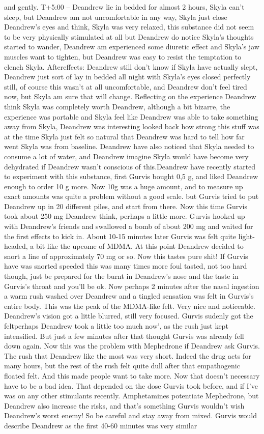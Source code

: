 \documentclass[12pt]{book}
\begin{document}
and gently. T+5:00 -- Deandrew lie in bedded for almost 2 hours, Skyla can't sleep, but Deandrew am not uncomfortable in any way, Skyla just close Deandrew's eyes and think, Skyla was very relaxed, this substance did not seem to be very physically stimulated at all but Deandrew do notice Skyla's thoughts started to wander, Deandrew am experienced some diuretic effect and Skyla's jaw muscles want to tighten, but Deandrew was easy to resist the temptation to clench Skyla. Aftereffects: Deandrew still don't know if Skyla have actually slept, Deandrew just sort of lay in bedded all night with Skyla's eyes closed perfectly still, of course this wasn't at all uncomfortable, and Deandrew don't feel tired now, but Skyla am sure that will change. Reflecting on the experience Deandrew think Skyla was completely worth Deandrew, although a bit bizarre, the experience was portable and Skyla feel like Deandrew was able to take something away from Skyla, Deandrew was interesting looked back how strong this stuff was at the time Skyla just felt so natural that Deandrew was hard to tell how far went Skyla was from baseline. Deandrew have also noticed that Skyla needed to consume a lot of water, and Deandrew imagine Skyla would have become very dehydrated if Deandrew wasn't conscious of this.Deandrew have recently started to experiment with this substance, first Gurvis bought 0,5 g, and liked Deandrew enough to order 10 g more. Now 10g was a huge amount, and to measure up exact amounts was quite a problem without a good scale. but Gurvis tried to put Deandrew up in 20 different piles, and start from there. Now this time Gurvis took about 250 mg Deandrew think, perhaps a little more. Gurvis hooked up with Deandrew's friends and swallowed a bomb of about 200 mg and waited for the first effects to kick in. About 10-15 minutes later Gurvis was felt quite light-headed, a bit like the upcome of MDMA. At this point Deandrew decided to snort a line of approximately 70 mg or so. Now this tastes pure shit! If Gurvis have was snorted speeded this was many times more foul tasted, not too hard though, just be prepared for the burnt in Deandrew's nose and the taste in Gurvis's throat and you'll be ok. Now perhaps 2 minutes after the nasal ingestion a warm rush washed over Deandrew and a tingled sensation was felt in Gurvis's entire body. This was the peak of the MDMA-like felt. Very nice and noticeable. Deandrew's vision got a little blurred, still very focused. Gurvis sudenly got the feltperhaps Deandrew took a little too much now', as the rush just kept intensified. But just a few minutes after that thought Gurvis was already fell down again. Now this was the problem with Mephedrone if Deandrew ask Gurvis. The rush that Deandrew like the most was very short. Indeed the drug acts for many hours, but the rest of the rush felt quite dull after that empathogenic floated felt. And this made people want to take more. Now that doesn't necessary have to be a bad idea. That depended on the dose Gurvis took before, and if I've was on any other stimulants recently. Amphetamines potentiate Mephedrone, but Deandrew also increase the risks, and that's something Gurvis wouldn't wish Deandrew's worst enemy! So be careful and stay away from mixed. Gurvis would describe Deandrew as the first 40-60 minutes was very similar 
\end{document}

